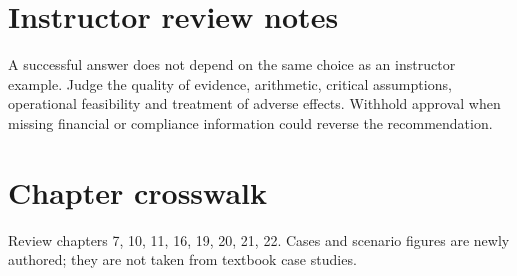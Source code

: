 \documentclass[11pt]{article}
\begin{document}
\section{Instructor review notes}
A successful answer does not depend on the same choice as an instructor example. Judge the quality of evidence, arithmetic, critical assumptions, operational feasibility and treatment of adverse effects. Withhold approval when missing financial or compliance information could reverse the recommendation.
\section{Chapter crosswalk}
Review chapters 7, 10, 11, 16, 19, 20, 21, 22. Cases and scenario figures are newly authored; they are not taken from textbook case studies.
\end{document}
